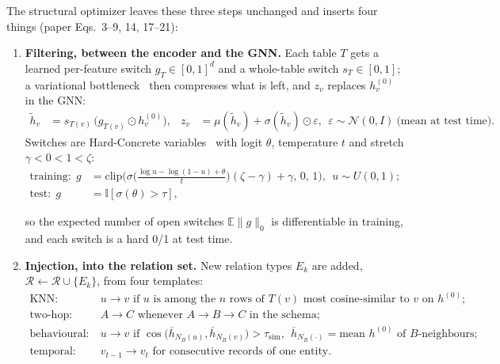 \documentclass{article}
\newcommand{\E}{\mathbb{E}}
\begin{document}
The structural optimizer leaves these three steps unchanged and inserts four things (paper Eqs.~3--9, 14, 17--21):
\begin{enumerate}
\item[\textbf{A}] \textbf{Filtering, between the encoder and the GNN.} Each table $T$ gets a learned per-feature switch $g_T\in[0,1]^{d}$ and a whole-table switch $s_T\in[0,1]$; a variational bottleneck~\cite{alemi2017vib} then compresses what is left, and $z_v$ replaces $h^{(0)}_v$ in the GNN:
\vspace{-0.35em}
\begin{align*}
\tilde h_v &= s_{T(v)}\,\big(g_{T(v)}\odot h^{(0)}_v\big), &
z_v &= \mu(\tilde h_v)+\sigma(\tilde h_v)\odot\varepsilon,\ \ \varepsilon\sim\mathcal N(0,I)\ \text{(mean at test time)}.
\end{align*}
\vspace{-1.1em}
Switches are Hard-Concrete variables~\cite{louizos2018l0} with logit $\theta$, temperature $t$ and stretch $\gamma<0<1<\zeta$:
\vspace{-0.35em}
\begin{align*}
\text{training:}\ \ g &= \mathrm{clip}\Big(\sigma\big(\tfrac{\log u-\log(1-u)+\theta}{t}\big)(\zeta-\gamma)+\gamma,\,0,\,1\Big),\ \ u\sim U(0,1);\\[-2pt]
\text{test:}\ \ g &= \mathbb I[\sigma(\theta)>\tau],
\end{align*}
\vspace{-1.1em}

so the expected number of open switches $\E\|g\|_0$ is differentiable in training, and each switch is a hard 0/1 at test time.
\item[\textbf{B}] \textbf{Injection, into the relation set.} New relation types $E_k$ are added, $\mathcal R\leftarrow\mathcal R\cup\{E_k\}$, from four templates:
\vspace{-0.35em}
\begin{align*}
\text{KNN:}&\ u\to v \text{ if } u \text{ is among the } n \text{ rows of } T(v) \text{ most cosine-similar to } v \text{ on } h^{(0)};\\[-2pt]
\text{two-hop:}&\ A\to C \text{ whenever } A\to B\to C \text{ in the schema};\\[-2pt]
\text{behavioural:}&\ u\to v \text{ if } \cos\!\big(\overline{h}_{N_B(u)},\overline{h}_{N_B(v)}\big)>\tau_{\text{sim}},\ \ \overline{h}_{N_B(\cdot)}=\text{mean } h^{(0)} \text{ of } B\text{-neighbours};\\[-2pt]
\text{temporal:}&\ v_{t-1}\to v_t \text{ for consecutive records of one entity.}
\end{align*}
\vspace{-1.1em}


\end{enumerate}
\end{document}
